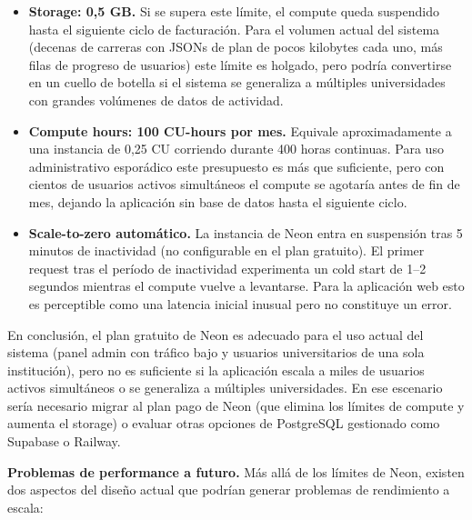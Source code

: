 \documentclass[12pt, a4paper]{report}
\begin{document}
\begin{itemize}
  \item \textbf{Storage: 0,5 GB.} Si se supera este límite, el compute queda suspendido
        hasta el siguiente ciclo de facturación. Para el volumen actual del sistema
        (decenas de carreras con JSONs de plan de pocos kilobytes cada uno, más filas de
        progreso de usuarios) este límite es holgado, pero podría convertirse en un
        cuello de botella si el sistema se generaliza a múltiples universidades con
        grandes volúmenes de datos de actividad.
  \item \textbf{Compute hours: 100 CU-hours por mes.} Equivale aproximadamente a una
        instancia de 0,25 CU corriendo durante 400 horas continuas. Para uso
        administrativo esporádico este presupuesto es más que suficiente, pero con
        cientos de usuarios activos simultáneos el compute se agotaría antes de fin
        de mes, dejando la aplicación sin base de datos hasta el siguiente ciclo.
  \item \textbf{Scale-to-zero automático.} La instancia de Neon entra en suspensión
        tras 5 minutos de inactividad (no configurable en el plan gratuito). El primer
        request tras el período de inactividad experimenta un cold start de 1--2
        segundos mientras el compute vuelve a levantarse. Para la aplicación web esto
        es perceptible como una latencia inicial inusual pero no constituye un error.
\end{itemize}

En conclusión, el plan gratuito de Neon es adecuado para el uso actual del sistema
(panel admin con tráfico bajo y usuarios universitarios de una sola institución), pero
no es suficiente si la aplicación escala a miles de usuarios activos simultáneos o se
generaliza a múltiples universidades. En ese escenario sería necesario migrar al plan
pago de Neon (que elimina los límites de compute y aumenta el storage) o evaluar otras
opciones de PostgreSQL gestionado como Supabase o Railway.

\textbf{Problemas de performance a futuro.} Más allá de los límites de Neon, existen
dos aspectos del diseño actual que podrían generar problemas de rendimiento a escala:
\end{document}
